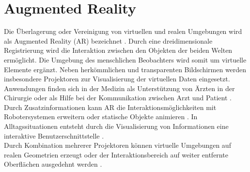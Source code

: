 \section{Augmented Reality}
Die Überlagerung oder Vereinigung von virtuellen und realen Umgebungen wird als Augmented Reality (AR) bezeichnet \cite{Azuma1997}. Durch eine dreidimensionale Registrierung wird die Interaktion zwischen den Objekten der beiden Welten ermöglicht. Die Umgebung des menschlichen Beobachters wird somit um virtuelle Elemente ergänzt. Neben herkömmlichen und transparenten Bildschirmen  werden insbesondere Projektoren zur Visualisierung der virtuellen Daten eingesetzt. Anwendungen finden sich in der Medizin als Unterstützung von Ärzten in der Chirurgie \cite{Gavaghan2012} \cite{Hoppe2001} oder als Hilfe bei der Kommunikation zwischen Arzt und Patient \cite{Bluteau2005}. Durch Zusatzinformationen kann AR die Interaktionsmöglichkeiten mit Robotersystemen erweitern \cite{DeTommaso2012} oder statische Objekte animieren \cite{Raskar1999}. In Alltagssituationen entsteht durch die Visualisierung von Informationen eine interaktive Benutzerschnittstelle \cite{Linder2010} \cite{Huber2012}.\\
Durch Kombination mehrerer Projektoren können virtuelle Umgebungen auf realen Geometrien erzeugt \cite{Low2001} oder der Interaktionsbereich auf weiter entfernte Oberflächen ausgedehnt werden \cite{Wilson2010}.


\\%
\\

